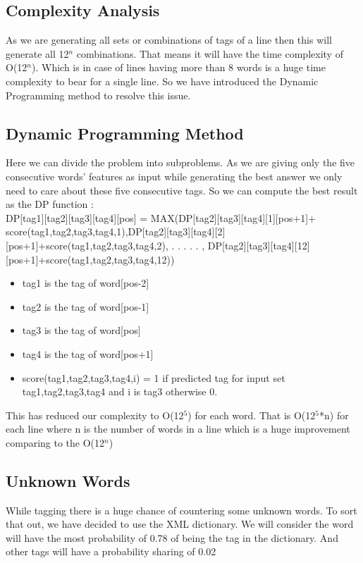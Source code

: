 \documentclass{standalone}
\begin{document}
\subsection{Complexity Analysis}
As we are generating all sets or combinations of tags of a line then this will generate all 12$^n$ combinations. That means it will have the time complexity of O(12$^n$). Which is in case of lines having more than 8 words is a huge time complexity to bear for a single line. So we have introduced the Dynamic Programming method to resolve this issue.
\subsection{Dynamic Programming Method}
Here we can divide the problem into subproblems. As we are giving only the five consecutive words’ features as input while generating the best answer we only need to care about these five consecutive tags. So  we can compute the best result as the DP function :\\
   DP[tag1][tag2][tag3][tag4][pos] = MAX(DP[tag2][tag3][tag4][1][pos+1]+ score(tag1,tag2,tag3,tag4,1),DP[tag2][tag3][tag4][2][pos+1]+score(tag1,tag2,tag3,tag4,2), . . . . . , DP[tag2][tag3][tag4][12][pos+1]+score(tag1,tag2,tag3,tag4,12)) 
   \begin{itemize}
       \item tag1 is the tag of word[pos-2]
        \item tag2 is the tag of word[pos-1]
         \item tag3 is the tag of word[pos]
          \item tag4 is the tag of word[pos+1]
          \item score(tag1,tag2,tag3,tag4,i) = 1 if predicted tag for input set tag1,tag2,tag3,tag4 and i is tag3 otherwise 0.
   \end{itemize}
This has reduced our complexity to O(12$^5$) for each word. That is O(12$^5$*n) for each line where n is the number of words in a line which is a huge improvement comparing to the O(12$^n$) 
\subsection{Unknown Words}
While tagging there is a huge chance of countering some unknown words. To sort that out, we have decided to use the XML dictionary. We will consider the word will have the most probability of 0.78 of being the tag in the dictionary. And other tags will have a probability sharing of 0.02%
\end{document}
